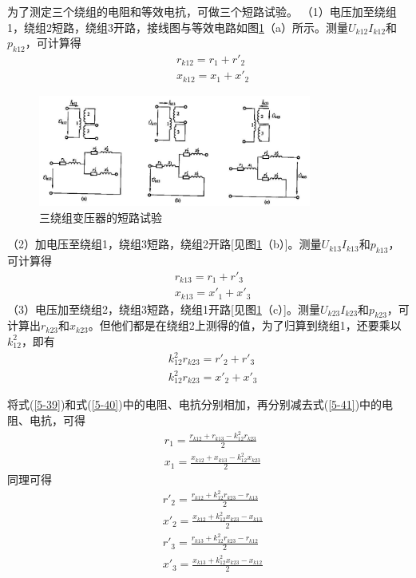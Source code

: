 \documentclass{book}
\begin{document}
为了测定三个绕组的电阻和等效电抗，可做三个短路试验。
（1）电压加至绕组1，绕组2短路，绕组3开路，接线图与等效电路如图\ref{fig_5-10}（a）所示。测量${{U}_{k12}}{{I}_{k12}}$和${{p}_{k12}}$，可计算得
\begin{align}
& {{r}_{k12}}={{r}_{1}}+{{{{r}'}}_{2}} \\ 
& {{x}_{k12}}={{x}_{1}}+{{{{x}'}}_{2}} 
\label{5-39}
\end{align}
\begin{figure}[H]
	\centering
	\includegraphics[width=0.80\textwidth]{5-10.png}
	\caption{三绕组变压器的短路试验}
	\label{fig_5-10}
\end{figure}

（2）加电压至绕组1，绕组3短路，绕组2开路[见图\ref{fig_5-10}（b）]。测量${{U}_{k13}}{{I}_{k13}}$和${{p}_{k13}}$，可计算得
\begin{align}
& {{r}_{k13}}={{r}_{1}}+{{{{r}'}}_{3}} \\ 
& {{x}_{k13}}={{{{x}'}}_{1}}+{{{{x}'}}_{3}} 
\label{5-40}
\end{align} 
（3）电压加至绕组2，绕组3短路，绕组1开路[见图\ref{fig_5-10}（c）]。测量${{U}_{k23}}{{I}_{k23}}$和${{p}_{k23}}$，可计算出${{r}_{k23}}$和${{x}_{k23}}$。但他们都是在绕组2上测得的值，为了归算到绕组1，还要乘以$k_{12}^{2}$，即有
\begin{align}
& k_{12}^{2}{{r}_{k23}}={{{{r}'}}_{2}}+{{{{r}'}}_{3}} \\ 
& k_{12}^{2}{{r}_{k23}}={{{{x}'}}_{2}}+{{{{x}'}}_{3}}
\label{5-41}
\end{align} 

将式(\ref{5-39})和式(\ref{5-40})中的电阻、电抗分别相加，再分别减去式(\ref{5-41})中的电阻、电抗，可得
\begin{align}
& {{r}_{1}}=\frac{{{r}_{k12}}+{{r}_{k13}}-k_{12}^{2}{{r}_{k23}}}{2} \\ 
& {{x}_{1}}=\frac{{{x}_{k12}}+{{x}_{k13}}-k_{12}^{2}{{x}_{k23}}}{2} 
\label{5-42}
\end{align}
同理可得
\begin{align}
& {{{{r}'}}_{2}}=\frac{{{r}_{k12}}+k_{12}^{2}{{r}_{k23}}-{{r}_{k13}}}{2} \\ 
& {{{{x}'}}_{2}}=\frac{{{x}_{k12}}+k_{12}^{2}{{x}_{k23}}-{{x}_{k13}}}{2} 
\label{5-43} 
\end{align}	
\begin{align}
& {{{{r}'}}_{3}}=\frac{{{r}_{k13}}+k_{12}^{2}{{r}_{k23}}-{{r}_{k12}}}{2} \\ 
& {{{{x}'}}_{3}}=\frac{{{x}_{k13}}+k_{12}^{2}{{x}_{k23}}-{{x}_{k12}}}{2}  
\label{5-44}
\end{align} 
\end{document}
